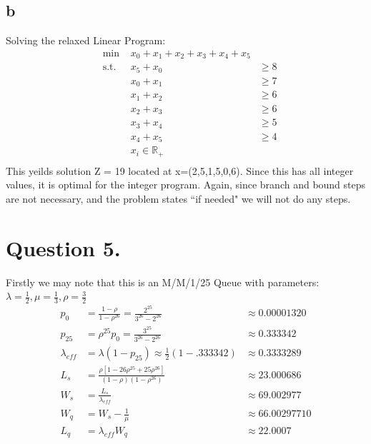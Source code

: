 \documentclass[10pt, letterpaper]{paper}
\begin{document}
\subsection*{b}
Solving the relaxed Linear Program:
\begin{equation*}
\begin{alignedat}{3}
&\text{min }&x_0 + x_1 + x_2 + x_3 + x_4 + x_5&\\
&\text{s.t. } &x_5 + x_0 &\geq 8\\
& &x_0 + x_1 &\geq 7\\
& &x_1 + x_2 &\geq 6\\
& &x_2 + x_3 &\geq 6\\
& &x_3 + x_4 &\geq 5\\
& &x_4 + x_5 &\geq 4\\
& &x_i \in \mathbb{R}_+ &\\
\end{alignedat}
\end{equation*}
This yeilds solution Z = 19 located at x=(2,5,1,5,0,6). Since this has all integer values, it is optimal for the integer program. Again, since branch and bound steps are not necessary, and the problem states ``if needed" we will not do any steps.

\section*{Question 5.}
Firstly we may note that this is an M/M/1/25 Queue with parameters: $\lambda = \frac{1}{2}, \mu = \frac{ 1}{3}, \rho = \frac{3}{2}$
\begin{equation*}
\begin{alignedat}{2}
p_0 &= \frac{ 1 - \rho }{ 1- \rho^{26} } = \frac{ 2^{25}}{ 3^{26} - 2^{26} } &\approx 0.00001320\\
p_{25} &= \rho^{25} p_0 = \frac{ 3^{25} } { 3^{26} - 2^{26} } &\approx 0.333342\\
\lambda_{eff} &= \lambda ( 1- p_{25} ) \approx \frac{1}{2} ( 1 - .333342 ) &\approx 0.3333289\\
L_s &= \frac{ \rho[ 1 - 26 \rho^{25} + 25 \rho^{26} ] }{ (1-\rho)(1-\rho^{26})} &\approx 23.000686\\
W_s &= \frac{ L_s } { \lambda_{eff}} &\approx 69.002977\\
W_q &= W_s - \frac{1}{\mu} &\approx 66.00297710\\
L_q &= \lambda_{eff} W_q &\approx 22.0007\\
\end{alignedat}
\end{equation*}
\end{document}
